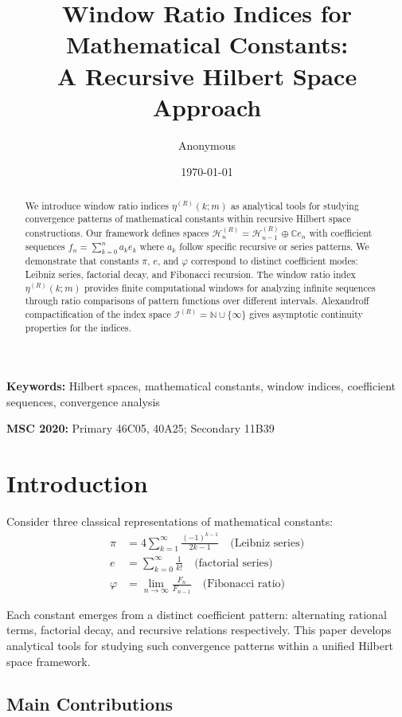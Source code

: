 \documentclass[12pt]{article}
\title{Window Ratio Indices for Mathematical Constants: \\ A Recursive Hilbert Space Approach}
\author{Anonymous}
\date{\today}
\theoremstyle{plain}
\theoremstyle{definition}
\begin{document}
\maketitle

\begin{abstract}
We introduce window ratio indices $\eta^{(R)}(k; m)$ as analytical tools for studying convergence patterns of mathematical constants within recursive Hilbert space constructions. Our framework defines spaces $\mathcal{H}_n^{(R)} = \mathcal{H}_{n-1}^{(R)} \oplus \mathbb{C} e_n$ with coefficient sequences $f_n = \sum_{k=0}^n a_k e_k$ where $a_k$ follow specific recursive or series patterns. We demonstrate that constants $\pi$, $e$, and $\varphi$ correspond to distinct coefficient modes: Leibniz series, factorial decay, and Fibonacci recursion. The window ratio index $\eta^{(R)}(k; m)$ provides finite computational windows for analyzing infinite sequences through ratio comparisons of pattern functions over different intervals. Alexandroff compactification of the index space $\mathcal{I}^{(R)} = \mathbb{N} \cup \{\infty\}$ gives asymptotic continuity properties for the indices.
\end{abstract}

\noindent\textbf{Keywords:} Hilbert spaces, mathematical constants, window indices, coefficient sequences, convergence analysis

\noindent\textbf{MSC 2020:} Primary 46C05, 40A25; Secondary 11B39

\section{Introduction}

Consider three classical representations of mathematical constants:
\begin{align}
\pi &= 4 \sum_{k=1}^{\infty} \frac{(-1)^{k-1}}{2k-1} \quad \text{(Leibniz series)} \\
e &= \sum_{k=0}^{\infty} \frac{1}{k!} \quad \text{(factorial series)} \\
\varphi &= \lim_{n \to \infty} \frac{F_n}{F_{n-1}} \quad \text{(Fibonacci ratio)}
\end{align}

Each constant emerges from a distinct coefficient pattern: alternating rational terms, factorial decay, and recursive relations respectively. This paper develops analytical tools for studying such convergence patterns within a unified Hilbert space framework.

\subsection{Main Contributions}
\end{document}
